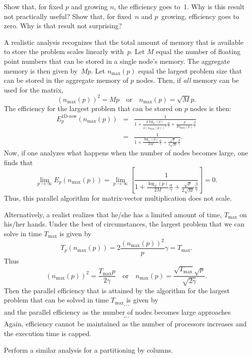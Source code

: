 \begin{exercise}
  Show that, for fixed $p$ and growing $n$, the efficiency goes
  to~1. Why is this result not practically useful? Show that, for
  fixed~$n$ and $p$~growing, efficiency goes to zero. Why is that
  result not surprising?
\end{exercise}

A realistic analysis recognizes that the total amount of memory that is
available to store the problem scales linearly with~$ p $.  Let $ M $
equal the number of floating point numbers that can be stored in a
single node's memory.  The aggregate memory is then given by~$ M p $.
Let $ n_{\mbox{max}}(p) $ equal the largest problem size that can be
stored in the aggregate memory of $ p $ nodes.  Then, if {\em all}
memory can be used for the matrix,
\[
(n_{\mbox{max}}(p))^2 = M p
\quad
\mbox{or}
\quad
n_{\mbox{max}}(p) = \sqrt{M} {p}.
\]
The efficiency for the largest problem that can be stored on $ p $
nodes is then:
\begin{eqnarray*}
E_p^{\mbox{1D-row}}(n_{\mbox{max}}(p)) &=& 
\frac{1}
{1 + \frac{p \log_2(p)}{2 (n_{\mbox{max}}(p))^2} \frac{\alpha}{\gamma} 
+ \frac{p}{2 n_{\mbox{max}}(p)} \frac{\beta}{\gamma} }
\\
&=&
\frac{1}
{ 1 + \frac{\log_2(p)}{2 M} \frac{\alpha}{\gamma} 
+ \frac{\sqrt{p}}{2 \sqrt{M}} \frac{\beta}{\gamma} }.
\end{eqnarray*}
Now, if one analyzes what happens when the number of nodes
becomes large, one finds that
\[
\lim_{p \rightarrow \infty} E_p( n_{\mbox{max}}(p) ) 
=
\lim_{p \rightarrow \infty}
\left[
\frac{1}
{1 + \frac{\log_2(p)}{2 M} \frac{\alpha}{\gamma} 
+ \frac{\sqrt{p}}{2 \sqrt{M}} \frac{\beta}{\gamma} }
\right]
=
0.
\]
Thus, this parallel algorithm for matrix-vector multiplication
does not scale.

Alternatively, a realist realizes that he/she has a limited amount of time,
$ T_{\mbox{max}} $ on
his/her hands.  Under the best of circumstances, the largest problem
that we can solve in time $ T_{\mbox{max}} $ is given by
\[ 
T_p(n_{\mbox{max}}(p)) = 2 \frac{(n_{\mbox{max}}(p))^2}{p} \gamma = T_{\mbox{max}} .
\]
Thus
\[
(n_{\mbox{max}}(p))^2 = \frac{T_{\mbox{max}} p}{2 \gamma}
\quad
\mbox{or}
\quad
n_{\mbox{max}}(p) = \frac{\sqrt{T_{\mbox{max}}} \sqrt{p}}{\sqrt{2 \gamma}}.
\]
Then the parallel efficiency that is attained by the algorithm for the largest
problem that can be solved in time $ T_{\mbox{max}} $ is given by
\[
~
\cdots
~\]
and the parallel efficiency as the number of nodes becomes large approaches
\[
~
\cdots
~
\]
Again, efficiency cannot be maintained as the number of processors increases and the execution time is capped.

\begin{exercise}
  Perform a similar analysis for a partitioning by columns.
\end{exercise}
